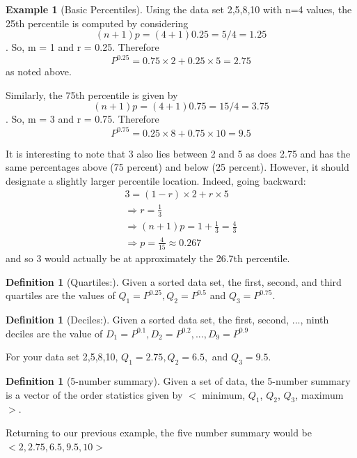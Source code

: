 \documentclass[10pt,]{book}
\theoremstyle{plain}
\theoremstyle{definition}
\newtheorem{definition}[theorem]{Definition}
\theoremstyle{definition}
\newtheorem{example}[theorem]{Example}
\numberwithin{equation}{section}
\newcommand{\lt}{ < }
\newcommand{\gt}{ > }
\begin{document}
\begin{example}[Basic Percentiles]\label{example-5}
Using the data set {2,5,8,10} with n=4 values, the 25th percentile is computed by considering 
		\begin{equation*}(n+1)p = (4+1)0.25 = 5/4 = 1.25\end{equation*}.  
		So, m = 1 and r = 0.25. Therefore 
		\begin{equation*}P^{0.25} = 0.75 \times 2 + 0.25 \times 5 = 2.75\end{equation*} 
		as noted above. 
\par

		Similarly, the 75th percentile is given by
		\begin{equation*}(n+1)p = (4+1)0.75 = 15/4 = 3.75\end{equation*}.  
		So, m = 3 and r = 0.75. Therefore 
		\begin{equation*}P^{0.75} = 0.25 \times 8 + 0.75 \times 10 = 9.5\end{equation*} 
		
		It is interesting to note that 3 also lies between 2 and 5 as does 2.75 and has the same percentages above (75 percent) and below (25 percent). However, it should designate a slightly larger percentile location. Indeed, going backward:
		\begin{gather*}
3 = (1-r) \times 2 + r \times 5\\
\Rightarrow r = \frac{1}{3}\\
\Rightarrow (n+1)p = 1 + \frac{1}{3} = \frac{4}{3}\\
\Rightarrow p = \frac{4}{15} \approx 0.267
\end{gather*}
		and so 3 would actually be at approximately the 26.7th percentile.
\end{example}
\begin{definition}[Quartiles:]\label{definition-4}
Given a sorted data set, the first, second, and third quartiles are the values of 
	\(Q_1 = P^{0.25}, Q_2 = P^{0.5}\) and \(Q_3 = P^{0.75}\).
\end{definition}
\begin{definition}[Deciles:]\label{definition-5}
Given a sorted data set, the first, second, ..., ninth deciles are the value of 
	\(D_1 = P^{0.1}, D_2 = P^{0.2}, ... , D_9 = P^{0.9}\)
\end{definition}
\par

	For your data set {2,5,8,10}, 
	\(Q_1 = 2.75, Q_2 = 6.5,\) and \(Q_3 = 9.5\).
\begin{definition}[5-number summary]\label{definition-6}
Given a set of data, the 5-number summary is a vector of the order statistics given by \(\lt\) minimum, \(Q_1\), \(Q_2\), \(Q_3\), maximum \(\gt\). 
\end{definition}
\par
Returning to our previous example, the five number summary would be
	\(\lt 2, 2.75, 6.5, 9.5, 10 \gt\)
\typeout{************************************************}
\typeout{************************************************}
\end{document}
